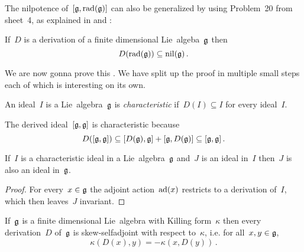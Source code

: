The nilpotence of~$[\mathfrak{g}, \operatorname{rad}(\mathfrak{g})]$ can also be generalized by using Problem~20 from sheet~4, as explained in \cite[I.{\S}5.5]{bourbaki_lie} and \cite[\S19.6]{tauvel_yu}:

\begin{theorem}
  \label{derivations map radical into nilradical}
  If~$D$ is a derivation of a finite dimensional Lie~algeba~$\mathfrak{g}$ then
  \[
    D(\operatorname{rad}(\mathfrak{g}))
    \subseteq
    \operatorname{nil}(\mathfrak{g}) \,.
  \]
\end{theorem}

We are now gonna prove this .
We have split up the proof in multiple small steps each of which is interesting on its own.

\begin{definition}
  An ideal~$I$ is a Lie~algebra~$\mathfrak{g}$ is \emph{characteristic} if~$D(I) \subseteq I$ for every ideal~$I$.
\end{definition}

\begin{example}
  The derived ideal~$[\mathfrak{g}, \mathfrak{g}]$ is characteristic because
  \[
    D([\mathfrak{g}, \mathfrak{g}])
    \subseteq
    [D(\mathfrak{g}), \mathfrak{g}] + [\mathfrak{g}, D(\mathfrak{g})]
    \subseteq
    [\mathfrak{g}, \mathfrak{g}]  \,.
  \]
\end{example}

\begin{lemma}
  \label{transitivity of ideals}
  If~$I$ is a characteristic ideal in a Lie~algebra~$\mathfrak{g}$ and~$J$ is an ideal in~$I$ then~$J$ is also an ideal in~$\mathfrak{g}$.
\end{lemma}

\begin{proof}
  For every~$x \in \mathfrak{g}$ the adjoint action~$\operatorname{ad}(x)$ restricts to a derivation of~$I$, which then leaves~$J$ invariant.
\end{proof}

\begin{lemma}
  If~$\mathfrak{g}$ is a finite dimensional Lie~algebra with Killing form~$\kappa$ then every derivation~$D$ of~$\mathfrak{g}$ is skew-selfadjoint with respect to~$\kappa$, i.e. for all~$x, y \in \mathfrak{g}$,
  \[
    \kappa(D(x), y) 
    =
    -\kappa(x, D(y)) \,.
  \]
\end{lemma}

